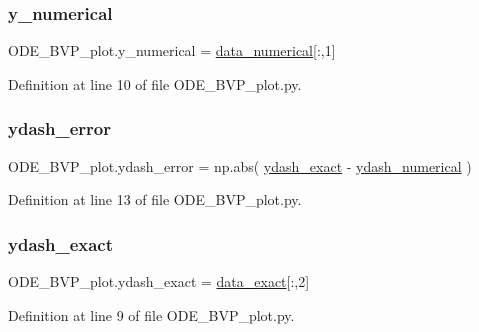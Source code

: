 \subsubsection{\texorpdfstring{y\+\_\+numerical}{y\_numerical}}
{\footnotesize\ttfamily O\+D\+E\+\_\+\+B\+V\+P\+\_\+plot.\+y\+\_\+numerical = \hyperlink{namespaceODE__BVP__plot_ad4ab2d9ae63df8f94362a1abefb1b540}{data\+\_\+numerical}\mbox{[}\+:,1\mbox{]}}



Definition at line 10 of file O\+D\+E\+\_\+\+B\+V\+P\+\_\+plot.\+py.

\mbox{\label{namespaceODE__BVP__plot_a32b60056578e16000892cd7c6286aa07}} 
\subsubsection{\texorpdfstring{ydash\+\_\+error}{ydash\_error}}
{\footnotesize\ttfamily O\+D\+E\+\_\+\+B\+V\+P\+\_\+plot.\+ydash\+\_\+error = np.\+abs( \hyperlink{namespaceODE__BVP__plot_a391db2f2f7f3511be763c10ed7451340}{ydash\+\_\+exact} -\/ \hyperlink{namespaceODE__BVP__plot_a321cad715aaa19b55082e3163d7cf2ee}{ydash\+\_\+numerical} )}



Definition at line 13 of file O\+D\+E\+\_\+\+B\+V\+P\+\_\+plot.\+py.

\mbox{\label{namespaceODE__BVP__plot_a391db2f2f7f3511be763c10ed7451340}} 
\subsubsection{\texorpdfstring{ydash\+\_\+exact}{ydash\_exact}}
{\footnotesize\ttfamily O\+D\+E\+\_\+\+B\+V\+P\+\_\+plot.\+ydash\+\_\+exact = \hyperlink{namespaceODE__BVP__plot_a622c61e641f1695a3b9cc06bed3fbb3e}{data\+\_\+exact}\mbox{[}\+:,2\mbox{]}}



Definition at line 9 of file O\+D\+E\+\_\+\+B\+V\+P\+\_\+plot.\+py.

